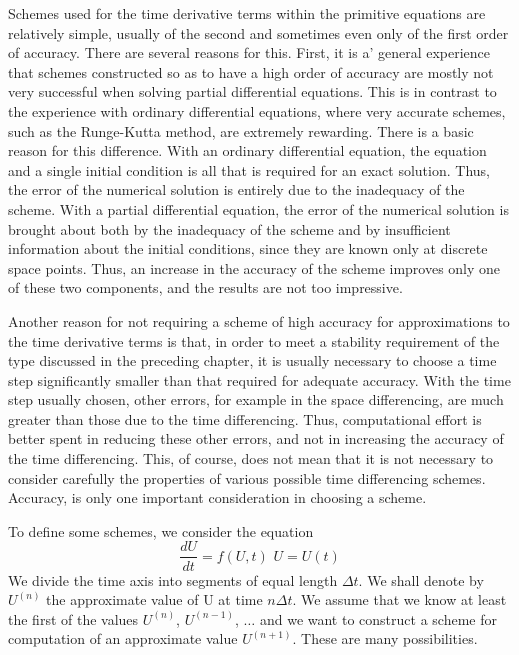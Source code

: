 Schemes used for the time derivative terms within the primitive equations are relatively simple, usually of the second and sometimes even only of the first order of accuracy. There are several reasons for this. First, it is a’ general experience that schemes constructed so as to have a high order of accuracy are mostly not very successful when solving partial differential equations. This is in contrast to the experience with ordinary differential equations, where very accurate schemes, such as the Runge-Kutta method, are extremely rewarding. There is a basic reason for this difference. With an ordinary differential equation, the equation and a single initial condition is all that is required for an exact solution. Thus, the error of the numerical solution is entirely due to the inadequacy of the scheme. With a partial differential equation, the error of the numerical solution is brought about both by the inadequacy of the scheme and by insufficient information about the initial conditions, since they are known only at discrete space points. Thus, an increase in the accuracy of the scheme improves only one of these two components, and the results are not too impressive.

Another reason for not requiring a scheme of high accuracy for approximations to the time derivative terms is that, in order to meet a stability requirement of the type discussed in the preceding chapter, it is usually necessary to choose a time step significantly smaller than that required for adequate accuracy. With the time step usually chosen, other errors, for example in the space differencing, are much greater than those due to the time differencing. Thus, computational effort is better spent in reducing these other errors, and not in increasing the accuracy of the time differencing. This, of course, does not mean that it is not necessary to consider carefully the properties of various possible time differencing schemes. Accuracy, is only one important consideration in choosing a scheme.

To define some schemes, we consider the equation
\begin{equation}\label{eq.3.1.3}
	\frac{dU}{dt}= f(U,t) \,\, U=U(t)
\end{equation}
We divide the time axis into segments of equal length $\Delta t$. We shall denote by
$U^{(n)}$ the approximate value of U at time $n\Delta t$. We assume that we know at least the first of the values $U^{(n)}$, $U^{(n-1)}$, $\dots$ and we want to construct a scheme for computation of an approximate value $U^{(n+1)}$. These are many possibilities.

